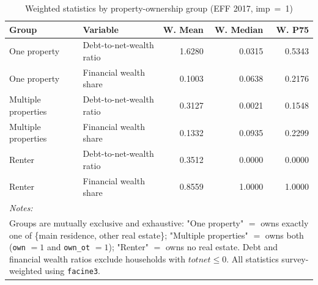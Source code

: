 \begin{table}[!h]

\caption{\label{tab:group_comparison}Weighted statistics by property-ownership group (EFF 2017, imp~=~1)}
\centering
\begin{tabular}[t]{llrrr}
\toprule
Group & Variable & W. Mean & W. Median & W. P75\\
\midrule
One property & Debt-to-net-wealth ratio & 1.6280 & 0.0315 & 0.5343\\
One property & Financial wealth share & 0.1003 & 0.0638 & 0.2176\\
Multiple properties & Debt-to-net-wealth ratio & 0.3127 & 0.0021 & 0.1548\\
Multiple properties & Financial wealth share & 0.1332 & 0.0935 & 0.2299\\
Renter & Debt-to-net-wealth ratio & 0.3512 & 0.0000 & 0.0000\\
\addlinespace
Renter & Financial wealth share & 0.8559 & 1.0000 & 1.0000\\
\bottomrule
\multicolumn{5}{l}{\rule{0pt}{1em}\textit{Notes: }}\\
\multicolumn{5}{l}{\rule{0pt}{1em}Groups are mutually exclusive and exhaustive: "One property" $=$ owns exactly one of \{main residence, other real estate\}; "Multiple properties" $=$ owns both (\texttt{own} $=1$ and \texttt{own\_ot} $=1$); "Renter" $=$ owns no real estate. Debt and financial wealth ratios exclude households with $\mathit{totnet} \leq 0$. All statistics survey-weighted using \texttt{facine3}.}\\
\end{tabular}
\end{table}
